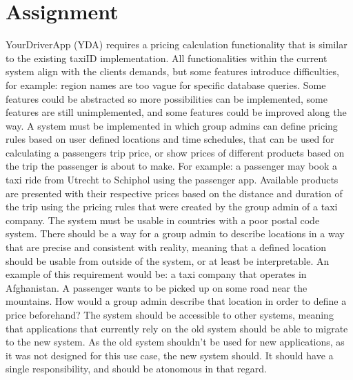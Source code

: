 %
\section{Assignment}
YourDriverApp (YDA) requires a pricing calculation functionality that is similar to the existing taxiID implementation. All functionalities within the current system align with the clients demands, but some features introduce difficulties, for example: region names are too vague for specific database queries. Some features could be abstracted so more possibilities can be implemented, some features are still unimplemented, and some features could be improved along the way. A system must be implemented in which group admins can define pricing rules based on user defined locations and time schedules, that can be used for calculating a passengers trip price, or show prices of different products based on the trip the passenger is about to make. For example: a passenger may book a taxi ride from Utrecht to Schiphol using the passenger app. Available products are presented with their respective prices based on the distance and duration of the trip using the pricing rules that were created by the group admin of a taxi company. The system must be usable in countries with a poor postal code system. There should be a way for a group admin to describe locations in a way that are precise and consistent with reality, meaning that a defined location should be usable from outside of the system, or at least be interpretable. An example of this requirement would be: a taxi company that operates in Afghanistan. A passenger wants to be picked up on some road near the mountains. How would a group admin describe that location in order to define a price beforehand? The system should be accessible to other systems, meaning that applications that currently rely on the old system should be able to migrate to the new system. As the old system shouldn't be used for new applications, as it was not designed for this use case, the new system should. It should have a single responsibility, and should be atonomous in that regard.

